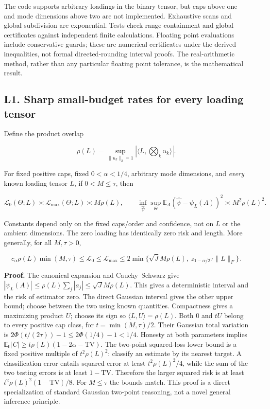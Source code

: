 \documentclass[
  10pt,
]{article}
\begin{document}
The code supports arbitrary loadings in the binary tensor, but caps
above one and mode dimensions above two are not implemented. Exhaustive
scans and global subdivision are exponential. Tests check range
containment and global certificates against independent finite
calculations. Floating point evaluations include conservative guards;
these are numerical certificates under the derived inequalities, not
formal directed-rounding interval proofs. The real-arithmetic method,
rather than any particular floating point tolerance, is the mathematical
result.

\subsection{L1. Sharp small-budget rates for every loading
tensor}\label{l1.-sharp-small-budget-rates-for-every-loading-tensor}

Define the product overlap

\[\rho(L)=\sup_{\|u_k\|_2=1}|\langle L,\bigotimes_k u_k\rangle|.\]

For fixed positive caps, fixed \(0<\alpha<1/4\), arbitrary mode
dimensions, and \emph{every} known loading tensor \(L\), if
\(0<M\le\tau\), then

\[\mathcal L_0(\Theta;L)\asymp\mathcal L_{\max}(\Theta;L)
\asymp M\rho(L),\qquad
\inf_{\widehat\psi}\sup_\Theta\mathbb E_A
(\widehat\psi-\psi_L(A))^2\asymp M^2\rho(L)^2.\]

Constants depend only on the fixed caps/order and confidence, not on
\(L\) or the ambient dimensions. The zero loading has identically zero
risk and length. More generally, for all \(M,\tau>0\),

\[c_\alpha\rho(L)\min(M,\tau)
\le \mathcal L_0\le\mathcal L_{\max}
\le 2\min\{\sqrt J M\rho(L),\ z_{1-\alpha/2}\tau\|L\|_F\}.\]

\textbf{Proof.} The canonical expansion and Cauchy--Schwarz give
\(|\psi_L(A)|\le\rho(L)\sum_j|a_j|\le\sqrt J M\rho(L)\). This gives a
deterministic interval and the risk of estimator zero. The direct
Gaussian interval gives the other upper bound; choose between the two
using known quantities. Compactness gives a maximizing product \(U\);
choose its sign so \(\langle L,U\rangle=\rho(L)\). Both \(0\) and \(tU\)
belong to every positive cap class, for \(t=\min(M,\tau)/2\). Their
Gaussian total variation is \(2\Phi(t/(2\tau))-1\le2\Phi(1/4)-1<1/4\).
Honesty at both parameters implies
\(\mathbb E_0|C|\ge t\rho(L)(1-2\alpha-\mathrm{TV})\). The two-point
squared-loss lower bound is a fixed positive multiple of
\(t^2\rho(L)^2\): classify an estimate by its nearest target. A
classification error entails squared error at least \(t^2\rho(L)^2/4\),
while the sum of the two testing errors is at least \(1-\mathrm{TV}\).
Therefore the larger squared risk is at least
\(t^2\rho(L)^2(1-\mathrm{TV})/8\). For \(M\le\tau\) the bounds match.
This proof is a direct specialization of standard Gaussian two-point
reasoning, not a novel general inference principle.
\end{document}

